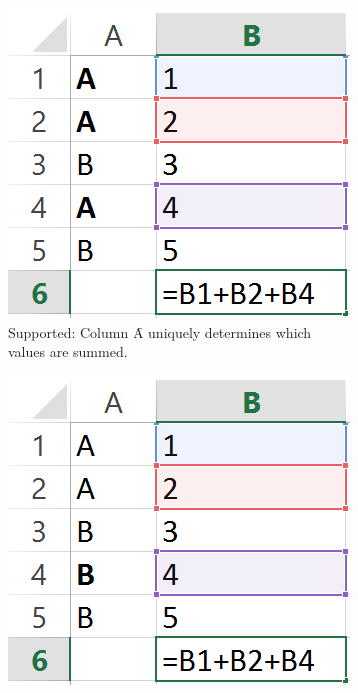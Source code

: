 \begin{figure}
	\centering
	\begin{subfigure}[t]{0.25\textwidth}
		\includegraphics[width=\textwidth]{implementation/aggregate/scenario1}
		\caption{Supported: \newline Column \f{A} uniquely determines which values are summed.}
		\label{fig:introcondaggrScenario1}
	\end{subfigure}
	\hspace{0.05\textwidth}
	\begin{subfigure}[t]{0.25\textwidth}
		\includegraphics[width=\textwidth]{implementation/aggregate/scenario2}

\end{subfigure}
\end{figure}
